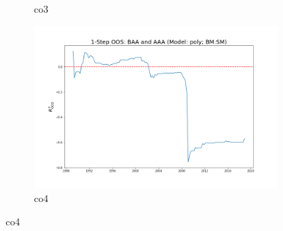 \documentclass[a4paper,12pt,times,numbered,print,index]{report}
\numberwithin{equation}{section}
\begin{document}
\begin{figure}[!htbp]
\begin{subfigure}[b]{0.42\linewidth}
			\caption{co3}
		\end{subfigure}
		\begin{subfigure}[b]{0.42\linewidth}
			\includegraphics[width=0.9\linewidth]{OOS_plots/poly_co4_SM.png}
			\caption{co4}
		\end{subfigure}
		\label{g7}
	\end{figure}
	
\end{document}
